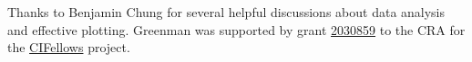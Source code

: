 \documentclass[english,submission,cleveref]{programming}
\begin{document}
% 





\acks

Thanks to Benjamin Chung for several helpful discussions about data analysis
and effective plotting.
Greenman was supported by
grant \href{https://nsf.gov/awardsearch/showAward?AWD_ID=2030859&HistoricalAwards=false}{2030859}
to the CRA for the \href{https://cifellows2020.org}{CIFellows} project.

%
%
%
%
%
%


\end{document}
